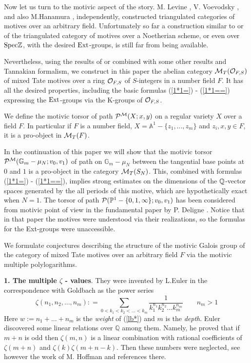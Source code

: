 \documentclass[10pt]{article}
\begin{document}
Now let us turn to the motivic aspect of the story. 
M. Levine \cite{L},  V. Voevodsky \cite{V}, and also M.Hanamura \cite{H}, independently, 
 constructed triangulated categories of motives over an arbitrary  field.  
Unfortunately  so far a construction similar to \cite{L} or \cite{V} of the 
triangulated category of 
motives over a 
Noetherian scheme, or even over ${\rm Spec}{\mathbb Z}$,  with the desired ${\rm Ext}$-groups, 
is still far from being available. 

Nevertheless,  using the results of \cite{L} or  \cite{V} combined with some other results 
and Tannakian formalism, we construct in this paper 
  the abelian category ${\cal M}_T({\cal O}_{F,S})$ of mixed Tate motives over 
a ring ${\cal O}_{F,S}$ of $S$-integers in a number field $F$. 
 It has all the desired properties, including the basic formulas 
(\ref{1*1=}) - (\ref{1*1==}) 
expressing 
the ${\rm Ext}$-groups  via the K-groups of ${\cal O}_{F,S}$. 

We define the motivic torsor  
of path ${\cal P}^{\cal M}(X; x,y)$ on a regular variety $X$ over a field $F$. 
In particular if $F$ is a number field,  $X = {\mathbb A}^1 - \{z_1, ..., z_m\}$
 and  $ z_i, x, y \in F$, it is a pro-object in ${\cal M}_T(F)$. 

 In the continuation of this  paper we will show that the 
motivic torsor ${\cal P}^{{\cal M}}({\mathbb G}_m - \mu_N; v_0, v_1)$ 
of path 
on ${\mathbb G}_m - \mu_N$ between the tangential base points at $0$ and $1$ is a 
pro-object in the category ${\cal M}_T(S_N)$. 
This, combined with formulas (\ref{1*1=}) - (\ref{1*1==}),  
implies strong estimates on the dimensions of the ${\mathbb Q}$-vector 
spaces generated by the all periods of this motive, which are hypothetically exact 
when $N=1$. 
The torsor of path ${\cal P}({\mathbb P}^1 - \{0, 1, \infty\}; v_0, v_1)$ 
has been considered from motivic
point of view in the fundamental paper by P. Deligne \cite{D}. Notice that in  
that paper the motives were 
 understood via their realizations, so the formulas for the Ext-groups 
were unaccessible. 


We formulate conjectures describing the structure of the motivic Galois group of 
the category of mixed Tate motives over an arbitrary field $F$ 
via the motivic multiple polylogarithms. 


{\bf 1. The multiple $\zeta$ - values}. They were invented by L.Euler in the
correspondence with Goldbach \cite{E} as the  power series
\begin{equation} \label{lb*}
\zeta(n_{1}, n_2, ...,n_{m}) : = \sum_{0 < k_{1} < k_{2} < ... < k_{m} }
\frac{1}{k_{1}^{n_{1}}k_{2}^{n_{2}}...k_{m}^{n_{m}}} \qquad n_m >1
\end{equation}
  Here $w := n_1+...+n_m$ is the {\it  weight} of (\ref{lb*}) and $m$
is the {\it  depth}. 
Euler discovered some linear relations
over ${\mathbb Q}$ among them. Namely, he proved that   if $m+n$ is odd then 
$\zeta(m,n)$ is a linear combination with rational coefficients
of $\zeta(m+n)$ and  $\zeta(k)\zeta(m+n-k)$. 
Then these numbers were neglected, see however the work of 
M. Hoffman \cite{Hof}  and references there. 
 
\end{document}
